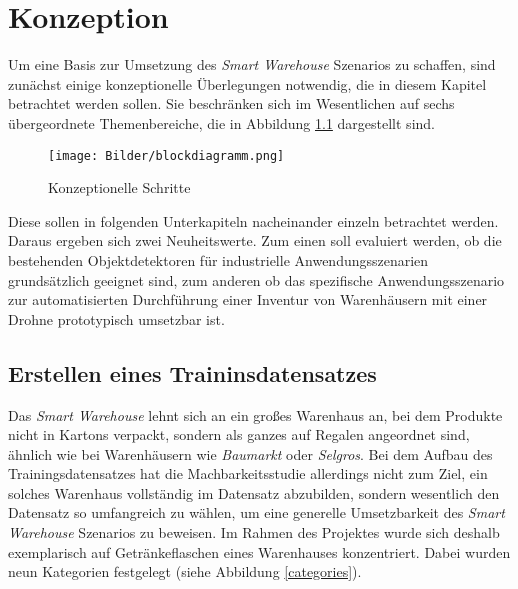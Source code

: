 \chapter{Konzeption}

Um eine Basis zur Umsetzung des \textit{Smart Warehouse} Szenarios zu schaffen, sind zunächst einige konzeptionelle Überlegungen notwendig, die in diesem Kapitel betrachtet werden sollen. Sie beschränken sich im Wesentlichen auf sechs übergeordnete Themenbereiche, die in Abbildung \ref{schritte} dargestellt sind. 

\begin{figure}[ht]
	\begin{center}
		\texttt{[image: Bilder/blockdiagramm.png]} 
		\caption[Konzeptionelle Schritte]{Konzeptionelle Schritte}
		\label{schritte}
	\end{center}
\end{figure}

Diese sollen in folgenden Unterkapiteln nacheinander einzeln betrachtet werden. Daraus ergeben sich zwei Neuheitswerte. Zum einen soll evaluiert werden, ob die bestehenden Objektdetektoren für industrielle Anwendungsszenarien grundsätzlich geeignet sind, zum anderen ob das spezifische Anwendungsszenario zur automatisierten Durchführung einer Inventur von Warenhäusern mit einer Drohne prototypisch umsetzbar ist.

\section{Erstellen eines Traininsdatensatzes}

Das \textit{Smart Warehouse} lehnt sich an ein großes Warenhaus an, bei dem Produkte nicht in Kartons verpackt, sondern als ganzes auf Regalen angeordnet sind, ähnlich wie bei Warenhäusern wie \textit{Baumarkt} oder \textit{Selgros}. Bei dem Aufbau des Trainingsdatensatzes hat die Machbarkeitsstudie allerdings nicht zum Ziel, ein solches Warenhaus vollständig im Datensatz abzubilden, sondern wesentlich den Datensatz so umfangreich zu wählen, um eine generelle Umsetzbarkeit des \textit{Smart Warehouse} Szenarios zu beweisen. Im Rahmen des Projektes wurde sich deshalb exemplarisch auf Getränkeflaschen eines Warenhauses konzentriert. Dabei wurden neun Kategorien festgelegt (siehe Abbildung \ref{categories}). 

